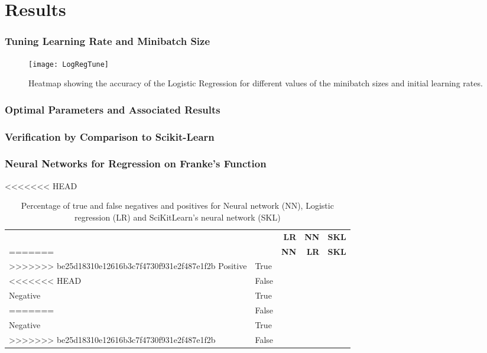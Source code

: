 \section{Results}
\label{sec:results}

\subsubsection{Tuning Learning Rate and Minibatch Size}
\begin{figure}[htbp]
	\centering
	\texttt{[image: LogRegTune]}
	\caption{Heatmap showing the accuracy of the Logistic Regression for different
    values of the minibatch sizes and initial learning rates.}
	\label{fig:TuneLogReg}
\end{figure}


\subsubsection*{Optimal Parameters and Associated Results}

\subsubsection{Verification by Comparison to Scikit-Learn}

\subsubsection{Neural Networks for Regression on Franke's Function}


\begin{table}[htbp]
<<<<<<< HEAD
\caption{Fraction of true and false negatives and positives for Neural network (NN), Logistic regression (LR) and SciKitLearn's neural network (SKL)}
	\begin{tabular}{l  l  r  r  r} 
		 & & \textbf{LR} & \textbf{NN} & \textbf{SKL} \\
=======
\caption{Percentage of true and false negatives and positives for Neural network (NN), Logistic regression (LR) and SciKitLearn's neural network (SKL)}
	\begin{tabular}{l  l  r  r  r}
		 & & \textbf{NN} & \textbf{LR} & \textbf{SKL} \\
>>>>>>> be25d18310e12616b3c7f4730f931e2f487e1f2b
		 \hline
		Positive & True & & & \\
<<<<<<< HEAD
		 & False &  & & \\ 
		 \hline
		Negative & True & &  & \\ 
=======
		 & False & & & \\
		 \hline
		Negative & True & & & \\
>>>>>>> be25d18310e12616b3c7f4730f931e2f487e1f2b
		& False & & & \\
	\end{tabular}
\label{tab:confusion}
\end{table}

\begin{figure}[htbp]
	\centering
	\caption{}
	\label{fig:}
\end{figure}
